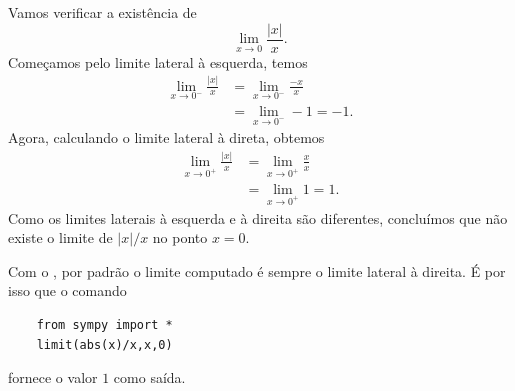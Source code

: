\begin{exer}
  Vamos verificar a existência de
  \begin{equation}
    \lim_{x\to 0} \frac{|x|}{x}.
  \end{equation}
  Começamos pelo limite lateral à esquerda, temos
  \begin{align}
    \lim_{x\to 0^-} \frac{|x|}{x} &= \lim_{x\to 0^-} \frac{-x}{x}\\
    &= \lim_{x\to 0^-} -1 = -1.
  \end{align}
  Agora, calculando o limite lateral à direta, obtemos
  \begin{align}
    \lim_{x\to 0^+} \frac{|x|}{x} &= \lim_{x\to 0^+} \frac{x}{x}\\
    &= \lim_{x\to 0^+} 1 = 1.
  \end{align}
  Como os limites laterais à esquerda e à direita são diferentes, concluímos que não existe o limite de $|x|/x$ no ponto $x=0$.

  \ifispython
  Com o {\sympy}, por padrão o limite computado é sempre o limite lateral à direita. É por isso que o comando
  \begin{lstlisting}
    from sympy import *
    limit(abs(x)/x,x,0)
  \end{lstlisting}
  fornece o valor $1$ como saída.
  \fi
\end{exer}

